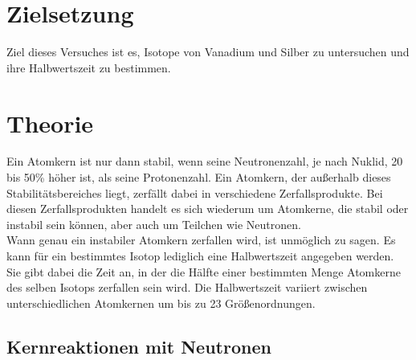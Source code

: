 \section{Zielsetzung}
\label{sec:ziel}

Ziel dieses Versuches ist es, Isotope von Vanadium und Silber zu untersuchen und ihre Halbwertszeit zu bestimmen.


\section{Theorie}
\label{sec:Theorie}

Ein Atomkern ist nur dann stabil, wenn seine Neutronenzahl, je nach Nuklid, 20 bis 50\% höher ist, als seine Protonenzahl. Ein Atomkern, der außerhalb
dieses Stabilitätsbereiches liegt, zerfällt dabei in verschiedene Zerfallsprodukte. Bei diesen Zerfallsprodukten handelt es sich wiederum um Atomkerne, die
stabil oder instabil sein können, aber auch um Teilchen wie Neutronen.\\
Wann genau ein instabiler Atomkern zerfallen wird, ist unmöglich zu sagen. Es kann für ein bestimmtes Isotop lediglich eine Halbwertszeit angegeben werden.
Sie gibt dabei die Zeit an, in der die Hälfte einer bestimmten Menge Atomkerne des selben Isotops
zerfallen sein wird. Die Halbwertszeit variiert zwischen unterschiedlichen Atomkernen um bis zu 23 Größenordnungen.


\subsection{Kernreaktionen mit Neutronen}

